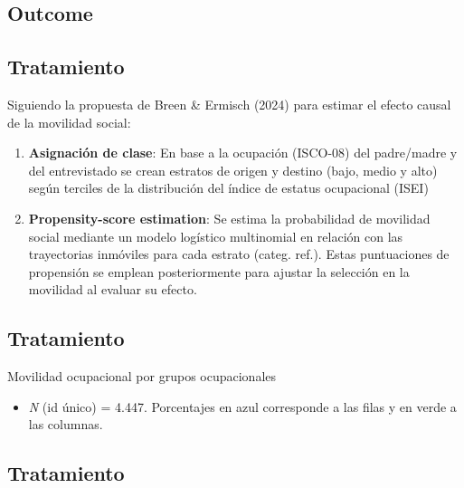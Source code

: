 \documentclass[
  spanish,
  letterpaper,
  DIV=11,
  numbers=noendperiod,
  oneside]{scrartcl}
\providecommand{\tightlist}{%
  \setlength{\itemsep}{0pt}\setlength{\parskip}{0pt}}
\begin{document}
\subsection{Outcome}\label{outcome}

\subsection{Tratamiento}\label{tratamiento}

Siguiendo la propuesta de Breen \& Ermisch (2024) para estimar el efecto
causal de la movilidad social:

\begin{enumerate}
\def\labelenumi{\arabic{enumi}.}
\item
  \textbf{Asignación de clase}: En base a la ocupación (ISCO-08) del
  padre/madre y del entrevistado se crean estratos de origen y destino
  (bajo, medio y alto) según terciles de la distribución del índice de
  estatus ocupacional (ISEI)
\item
  \textbf{Propensity-score estimation}: Se estima la probabilidad de
  movilidad social mediante un modelo logístico multinomial en relación
  con las trayectorias inmóviles para cada estrato (categ. ref.). Estas
  puntuaciones de propensión se emplean posteriormente para ajustar la
  selección en la movilidad al evaluar su efecto.
\end{enumerate}

\subsection{Tratamiento}\label{tratamiento-1}

\begin{table}

\caption{\label{tbl-ocup}Movilidad ocupacional por grupos ocupacionales}

\centering{

}

\end{table}%

\begin{itemize}
\tightlist
\item
  \emph{N} (id único) = 4.447. Porcentajes en azul corresponde a las
  filas y en verde a las columnas.
\end{itemize}

\subsection{Tratamiento}\label{tratamiento-2}
\end{document}
